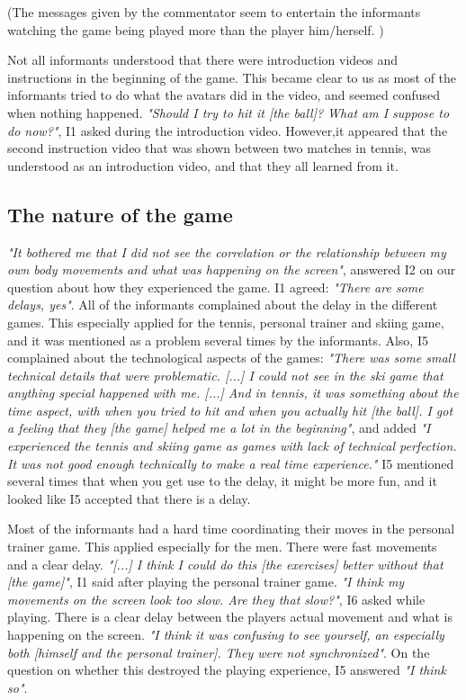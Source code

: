 (The messages given by the commentator seem to entertain the informants watching the game being played more than the player him/herself. )

Not all informants understood that there were introduction videos and instructions in the beginning of the game. This became clear to us as most of the informants tried to do what the avatars did in the video, and seemed confused when nothing happened. \emph{"Should I try to hit it [the ball]? What am I suppose to do now?"}, I1 asked during the introduction video. However,it appeared that the second instruction video that was shown between two matches in tennis, was understood as an introduction video, and that they all learned from it.  

\subsection{The nature of the game}
\emph{"It bothered me that I did not see the correlation or the relationship between my own body movements and what was happening on the screen"}, answered I2 on our question about how they experienced the game. I1 agreed: \emph{"There are some delays, yes"}. All of the informants complained about the delay in the different games. This especially applied for the tennis, personal trainer and skiing game, and it was mentioned as a problem several times by the informants. Also, I5 complained about the technological aspects of the games: \emph{"There was some small technical details that were problematic. [...] I could not see in the ski game that anything special happened with me. [...] And in tennis, it was something about the time aspect, with when you tried to hit and when you actually hit [the ball]. I got a feeling that they [the game] helped me a lot in the beginning"}, and added \emph{"I experienced the tennis and skiing game as games with lack of technical perfection. It was not good enough technically to make a real time experience."}  I5 mentioned several times that when you get use to the delay, it might be more fun, and it looked like I5 accepted that there is a delay. 

Most of the informants had a hard time coordinating their moves in the personal trainer game. This applied especially for the men. There were fast movements and a clear delay. \emph{"[...] I think I could do this [the exercises] better without that [the game]"}, I1 said after playing the personal trainer game. \emph{"I think my movements on the screen look too slow. Are they that slow?"}, I6 asked while playing. There is a clear delay between the players actual movement and what is happening on the screen.  \emph{"I think it was confusing to see yourself, an especially both [himself and the personal trainer]. They were not synchronized"}. On the question on whether this destroyed the playing experience, I5 answered \emph{"I think so"}. 

